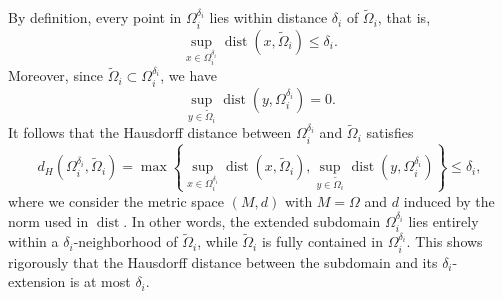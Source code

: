 \documentclass[a4paper, 11pt]{article}
\theoremstyle{remark}
\begin{document}
\noindent By definition, every point in $\Omega_i^{\delta_i}$ lies within distance $\delta_i$ of $\widetilde{\Omega}_i$, that is, 
\begin{equation*}
    \sup_{x \in \Omega_i^{\delta_{i}}} \operatorname{dist}(x, \widetilde{\Omega}_i) \leq \delta_i.
\end{equation*}
Moreover, since $\widetilde{\Omega}_i \subset \Omega_i^{\delta_{i}}$, we have 
\begin{equation*}
    \sup_{y \in \widetilde{\Omega}_i} \operatorname{dist}(y, \Omega_i^{\delta_{i}}) = 0.
\end{equation*}
It follows that the Hausdorff distance between $\Omega_i^{\delta_i}$ and $\widetilde{\Omega}_i$ satisfies
\begin{equation*}
    d_H(\Omega_i^{\delta_{i}}, \widetilde{\Omega}_i) = \max\left\{ \sup_{x \in \Omega_i^{\delta_{i}}} \operatorname{dist}(x, \widetilde{\Omega}_i), \sup_{y \in \widetilde{\Omega}_i} \operatorname{dist}(y, \Omega_i^{\delta_{i}}) \right\} \leq \delta_i,
\end{equation*}
where we consider the metric space $(M,d)$ with $M = \Omega$ and $d$ induced by the norm used in $\operatorname{dist}$. In other words, the extended subdomain $\Omega_i^{\delta_{i}}$ lies entirely within a $\delta_i$-neighborhood of $\widetilde{\Omega}_i$, while $\widetilde{\Omega}_i$ is fully contained in $\Omega_i^{\delta_{i}}$. This shows rigorously that the Hausdorff distance between the subdomain and its $\delta_i$-extension is at most $\delta_i$.
\end{document}
